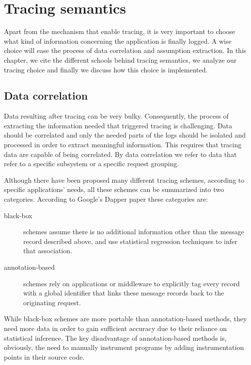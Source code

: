 \chapter{Tracing semantics}\label{ch:dapper-zipkin}

Apart from the mechanism that enable tracing, it is very important to choose
what kind of information concerning the application is finally logged. A wise
choice will ease the process of data correlation and assumption extraction. In
this chapter, we cite the different schools behind tracing semantics, we analyze
our tracing choice and finally we discuss how this choice is implemented.

\section{Data correlation}\label{sec:data-cor}

Data resulting after tracing can be very bulky. Consequently, the process of
extracting the information needed that triggered tracing is challenging. Data
should be correlated and only the needed parts of the logs should be isolated
and processed in order to extract meaningful information. This requires that
tracing data are capable of being correlated. By data correlation we refer to
data that refer to a specific subsystem or a specific request grouping.

Although there have been proposed many different tracing schemes, according to
specific applications' needs, all these schemes can be summarized into two
categories. According to Google's Dapper paper\cite{dapper} these categories
are:

\begin{description}

\item[black-box] schemes \cite{blackbox1, blackbox2} assume there is no
additional information other than the message record described above, and use
statistical regression techniques to infer that association.

\item[annotation-based] schemes \cite{magpie, xtrace} rely on applications or
middleware to explicitly tag every record with a global identifier that links
these message records back to the originating request.

\end{description}

While black-box schemes are more portable than annotation-based methods, they
need more data in order to gain sufficient accuracy due to their reliance on
statistical inference. The key disadvantage of annotation-based methods is,
obviously, the need to manually instrument programs by adding instrumentation
points in their source code.

